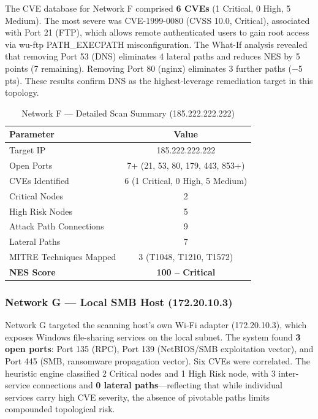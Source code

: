 \documentclass[conference]{IEEEtran}
\begin{document}
The CVE database for Network F comprised \textbf{6 CVEs} (1 Critical, 0 High, 5 Medium). The most severe was CVE-1999-0080 (CVSS 10.0, Critical), associated with Port 21 (FTP), which allows remote authenticated users to gain root access via wu-ftp PATH\_EXECPATH misconfiguration. The What-If analysis revealed that removing Port 53 (DNS) eliminates 4 lateral paths and reduces NES by 5 points (7 remaining). Removing Port 80 (nginx) eliminates 3 further paths ($-$5 pts). These results confirm DNS as the highest-leverage remediation target in this topology.

\begin{table}[htbp]
\caption{Network F --- Detailed Scan Summary (185.222.222.222)}
\begin{center}
\begin{tabular}{|l|c|}
\hline
\textbf{Parameter} & \textbf{Value} \\
\hline
Target IP & 185.222.222.222 \\
\hline
Open Ports & 7+ (21, 53, 80, 179, 443, 853+) \\
\hline
CVEs Identified & 6 (1 Critical, 0 High, 5 Medium) \\
\hline
Critical Nodes & 2 \\
\hline
High Risk Nodes & 5 \\
\hline
Attack Path Connections & 9 \\
\hline
Lateral Paths & 7 \\
\hline
MITRE Techniques Mapped & 3 (T1048, T1210, T1572) \\
\hline
\textbf{NES Score} & \textbf{100 -- Critical} \\
\hline
\end{tabular}
\label{tab:netF_detail}
\end{center}
\end{table}

\subsubsection{Network G --- Local SMB Host (172.20.10.3)}
Network G targeted the scanning host's own Wi-Fi adapter (172.20.10.3), which exposes Windows file-sharing services on the local subnet. The system found \textbf{3 open ports}: Port 135 (RPC), Port 139 (NetBIOS/SMB exploitation vector), and Port 445 (SMB, ransomware propagation vector). Six CVEs were correlated. The heuristic engine classified 2 Critical nodes and 1 High Risk node, with 3 inter-service connections and \textbf{0 lateral paths}---reflecting that while individual services carry high CVE severity, the absence of pivotable paths limits compounded topological risk.
\end{document}
